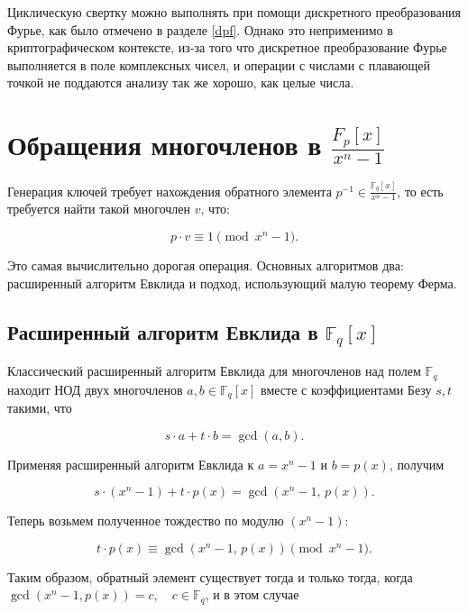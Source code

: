 \documentclass[14pt]{mmcs_article}
\theoremstyle{break}
\begin{document}
Циклическую свертку можно выполнять при помощи дискретного преобразования Фурье, как было отмечено в разделе \ref{dpf}. Однако это неприменимо в криптографическом контексте, из-за того что дискретное преобразование Фурье выполняется в поле комплексных чисел, и операции с числами с плавающей точкой не поддаются анализу так же хорошо, как целые числа.

\section{Обращения многочленов в $\frac{F_p[x]}{x^n - 1}$}
\label{sec4}

Генерация ключей требует нахождения обратного элемента $p^{-1} \in \frac{\mathbb{F}_q[x]}{x^n - 1}$, то есть требуется найти такой многочлен $v$, что:

\begin{equation}
    p \cdot v \equiv 1 \pmod{x^n - 1}.
\end{equation}

Это самая вычислительно дорогая операция. Основных алгоритмов два: расширенный алгоритм Евклида и подход, использующий малую теорему Ферма.

\subsection{Расширенный алгоритм Евклида в $\mathbb{F}_q[x]$}

Классический расширенный алгоритм Евклида для многочленов над полем $\mathbb{F}_q$ находит НОД двух многочленов $a, b \in \mathbb{F}_q[x]$ вместе с коэффициентами Безу $s, t$ такими, что

\begin{equation}
    s \cdot a + t \cdot b = \gcd(a, b).
\end{equation}

Применяя расширенный алгоритм Евклида к $a = x^n - 1$ и $b = p(x)$, получим

\begin{equation}
    s \cdot (x^n - 1) + t \cdot p(x) = \gcd(x^n - 1,\, p(x)).
\end{equation}

Теперь возьмем полученное тождество по модулю $(x^n - 1)$:

\begin{equation}
    t \cdot p(x) \equiv \gcd(x^n - 1,\, p(x)) \pmod{x^n - 1}.
\end{equation}

Таким образом, обратный элемент существует тогда и только тогда, когда $\gcd(x^n - 1, p(x)) = c,\quad c \in \mathbb{F}_q$, и в этом случае
\end{document}
